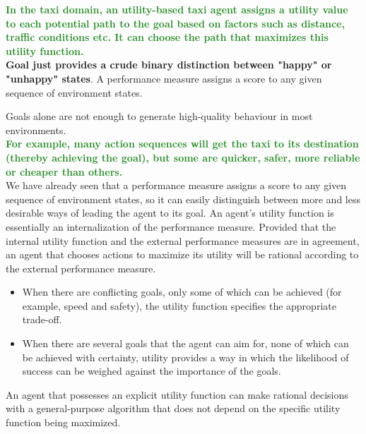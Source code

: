 \documentclass{article}
\begin{document}
\textcolor{ForestGreen}{\textbf{
    In the taxi domain, an utility-based taxi agent assigns a utility value to each potential path to the goal based on factors such as distance, traffic conditions etc. It can choose the path that maximizes this utility function.
}} \\

\textbf{Goal just provides a crude binary distinction between "happy" or "unhappy" states}. A performance measure assigns a score to any given sequence of environment states.

\newpage

Goals alone are not enough to generate high-quality behaviour in most environments. \\

\textcolor{ForestGreen}{\textbf{For example, many action sequences will get the taxi to its destination (thereby achieving the goal), but some are quicker, safer, more reliable or cheaper than others.}} \\

We have already seen that a performance measure assigns a score to any given sequence of environment states, so it can easily distinguish between more and less desirable ways of leading the agent to its goal. An agent’s utility function is essentially an internalization of the performance measure. Provided that the internal utility function and the external performance  measures  are  in  agreement,  an  agent  that  chooses  actions  to  maximize  its utility will be rational according to the external performance measure.

\vspace{2cm}

\begin{itemize}
    \item When there are conflicting goals, only some of which can be achieved  (for example, speed and safety), the utility function specifies the appropriate trade-off.
    \item When there are several goals that the agent can aim for, none of which can be achieved with certainty, utility provides a way in which the likelihood of success can be weighed against the importance of the goals.
\end{itemize}

An agent that possesses an explicit utility function can make rational decisions  with a general-purpose algorithm that does not depend on the specific utility function being maximized. 

\newpage
\end{document}
